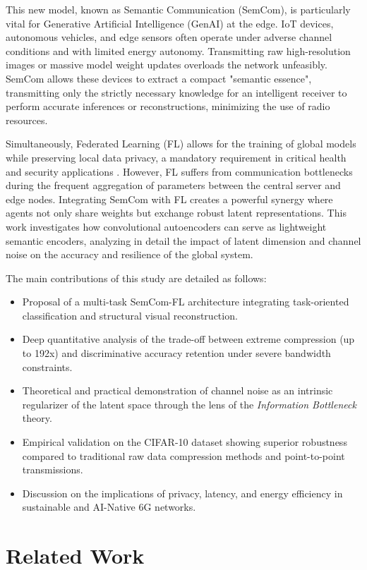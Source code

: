 \documentclass[conference,twocolumn]{IEEEtran}
\begin{document}
This new model, known as Semantic Communication (SemCom), is particularly vital for Generative Artificial Intelligence (GenAI) at the edge. IoT devices, autonomous vehicles, and edge sensors often operate under adverse channel conditions and with limited energy autonomy. Transmitting raw high-resolution images or massive model weight updates overloads the network unfeasibly. SemCom allows these devices to extract a compact "semantic essence", transmitting only the strictly necessary knowledge for an intelligent receiver to perform accurate inferences or reconstructions, minimizing the use of radio resources.

Simultaneously, Federated Learning (FL) allows for the training of global models while preserving local data privacy, a mandatory requirement in critical health and security applications \cite{mcmahan2017}. However, FL suffers from communication bottlenecks during the frequent aggregation of parameters between the central server and edge nodes. Integrating SemCom with FL creates a powerful synergy where agents not only share weights but exchange robust latent representations. This work investigates how convolutional autoencoders can serve as lightweight semantic encoders, analyzing in detail the impact of latent dimension and channel noise on the accuracy and resilience of the global system.

The main contributions of this study are detailed as follows:
\begin{itemize}
    \item Proposal of a multi-task SemCom-FL architecture integrating task-oriented classification and structural visual reconstruction.
    \item Deep quantitative analysis of the trade-off between extreme compression (up to 192x) and discriminative accuracy retention under severe bandwidth constraints.
    \item Theoretical and practical demonstration of channel noise as an intrinsic regularizer of the latent space through the lens of the \textit{Information Bottleneck} theory.
    \item Empirical validation on the CIFAR-10 dataset showing superior robustness compared to traditional raw data compression methods and point-to-point transmissions.
    \item Discussion on the implications of privacy, latency, and energy efficiency in sustainable and AI-Native 6G networks.
\end{itemize}

\section{Related Work}
\end{document}
